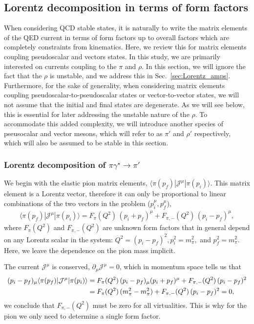  \subsection{Lorentz decomposition in terms of form factors \label{sec:Lorentz_FFs}}
When considering QCD stable states, it is naturally to write the matrix elements of the QED current in terms of form factors up to overall factors which are completely constraints from kinematics. Here, we review this for matrix elements coupling pseudoscalar and vectors states. In this study, we are primarily interested on currents coupling to the $\pi$ and $\rho$. In this section, we will ignore the fact that the $\rho$ is unstable, and we address this in Sec.~\ref{sec:Lorentz_amps}. Furthermore, for the sake of generality, when considering matrix elements coupling pseudoscalar-to-pseudoscalar states or vector-to-vector states, we will not assume that the initial and final states are degenerate. As we will see below, this is essential for later addressing the unstable nature of the $\rho$. To accommodate this added complexity, we will introduce another species of pseusocalar and vector mesons, which will refer to as $\pi'$ and $\rho'$ respectively, which will also be assumed to be stable in this section. 



\subsubsection{Lorentz decomposition of $\pi\gamma^\star\to\pi'$}
We begin with the elastic pion matrix elements, $\langle\pi(p_f)|{\mathcal{J}}^{\mu}|\pi(p_i)\rangle$. This matrix element is a Lorentz vector, therefore it can only be proportional to linear combinations of the two vectors in the problem ($p_i^\mu, p_f^\mu$),
\begin{align}
\langle\pi(p_f)|{\mathcal{J}}^{\mu}|\pi(p_i)\rangle=F_\pi(Q^2)\,(p_i+p_f)^\mu+F_{\pi,-}(Q^2)\,(p_i-p_f)^\mu,
\end{align}
where $F_\pi(Q^2)$ and $F_{\pi,-}(Q^2)$ are unknown form factors that in general depend on any Lorentz scalar in the system: $Q^2=(p_i-p_f)^2, p_i^2=m_\pi^2,$ and $p_f^2=m_\pi^2$. Here, we leave the dependence on the pion mass implicit. 

The current ${\mathcal{J}}^{\mu}$ is conserved, $\partial_\mu {\mathcal{J}}^{\mu}=0$, which in momentum space tells us that 
\begin{align}
(p_i-p_f)_\mu\langle\pi(p_f)|{\mathcal{J}}^{\mu}|\pi(p_i)\rangle&=F_\pi(Q^2)\, (p_i-p_f)_\mu(p_i+p_f)^\mu+F_{\pi,-}(Q^2)\,(p_i-p_f)^2
\nonumber\\
&=
F_\pi(Q^2)\, (m_\pi^2-m_\pi^2)
+
F_{\pi,-}(Q^2)\,(p_i-p_f)^2
=0,
\end{align}
we conclude that $F_{\pi,-}(Q^2)$ must be zero for all virtualities. This is why for the pion we only need to determine a single form factor. 

